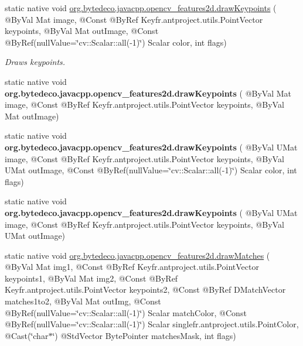 \begin{DoxyCompactItemize}
\item 
static native void \hyperlink{group__features2d__draw_gab17ce5fe7286fa915dae6cdf8cb80740}{org.\+bytedeco.\+javacpp.\+opencv\+\_\+features2d.\+draw\+Keypoints} ( @By\+Val Mat image, @Const @By\+Ref Key\+fr.antproject.utils.Point\+Vector keypoints, @By\+Val Mat out\+Image, @Const @By\+Ref(null\+Value=\char`\"{}cv\+::\+Scalar\+::all(-\/1)\char`\"{}) Scalar color, int flags)
\begin{DoxyCompactList}\small\item\em Draws keypoints. \end{DoxyCompactList}\item 
\mbox{\label{group__features2d__draw_ga18aef9cb01994f0af254ab372f831ac6}} 
static native void {\bfseries org.\+bytedeco.\+javacpp.\+opencv\+\_\+features2d.\+draw\+Keypoints} ( @By\+Val Mat image, @Const @By\+Ref Key\+fr.antproject.utils.Point\+Vector keypoints, @By\+Val Mat out\+Image)
\item 
\mbox{\label{group__features2d__draw_ga4c4a23f95c14884ca3395e2fb4ad3733}} 
static native void {\bfseries org.\+bytedeco.\+javacpp.\+opencv\+\_\+features2d.\+draw\+Keypoints} ( @By\+Val U\+Mat image, @Const @By\+Ref Key\+fr.antproject.utils.Point\+Vector keypoints, @By\+Val U\+Mat out\+Image, @Const @By\+Ref(null\+Value=\char`\"{}cv\+::\+Scalar\+::all(-\/1)\char`\"{}) Scalar color, int flags)
\item 
\mbox{\label{group__features2d__draw_ga23b952684915256406806d2bb36f2f09}} 
static native void {\bfseries org.\+bytedeco.\+javacpp.\+opencv\+\_\+features2d.\+draw\+Keypoints} ( @By\+Val U\+Mat image, @Const @By\+Ref Key\+fr.antproject.utils.Point\+Vector keypoints, @By\+Val U\+Mat out\+Image)
\item 
static native void \hyperlink{group__features2d__draw_gac84f37b93a8b6d5358211ec9b6d4799e}{org.\+bytedeco.\+javacpp.\+opencv\+\_\+features2d.\+draw\+Matches} ( @By\+Val Mat img1, @Const @By\+Ref Key\+fr.antproject.utils.Point\+Vector keypoints1, @By\+Val Mat img2, @Const @By\+Ref Key\+fr.antproject.utils.Point\+Vector keypoints2, @Const @By\+Ref D\+Match\+Vector matches1to2, @By\+Val Mat out\+Img, @Const @By\+Ref(null\+Value=\char`\"{}cv\+::\+Scalar\+::all(-\/1)\char`\"{}) Scalar match\+Color, @Const @By\+Ref(null\+Value=\char`\"{}cv\+::\+Scalar\+::all(-\/1)\char`\"{}) Scalar single\+fr.antproject.utils.Point\+Color, @Cast(\char`\"{}char$\ast$\char`\"{}) @Std\+Vector Byte\+Pointer matches\+Mask, int flags)

\end{DoxyCompactItemize}
